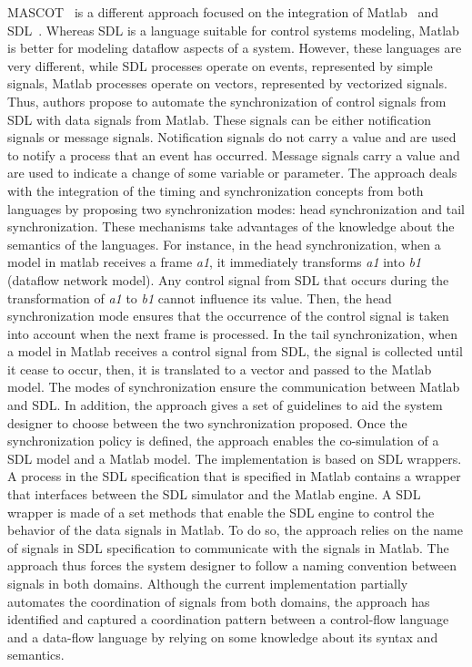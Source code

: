 MASCOT~\cite{mascotbib} is a different approach focused on the integration of Matlab~\cite{matlabbib} and SDL~\cite{sdlbib}. Whereas SDL is a language suitable for control systems modeling, Matlab is better for modeling dataflow aspects of a system. However, these languages are very different, while SDL processes operate on events, represented by simple signals, Matlab processes operate on vectors, represented by vectorized signals. Thus, authors propose to automate the synchronization of control signals from SDL with data signals from Matlab. These signals can be either notification signals or message signals. Notification signals do not carry a value and are used to notify a process that an event has occurred. Message signals carry a value and are used to indicate a change of some variable or parameter. The approach deals with the integration of the timing and synchronization concepts from both languages by proposing two synchronization modes: head synchronization and tail synchronization. These mechanisms take advantages of the knowledge about the semantics of the languages. For instance, in the head synchronization, when a model in matlab receives a frame \emph{a1}, it immediately transforms \emph{a1} into \emph{b1} (dataflow network model). Any control signal from SDL that occurs during the transformation of \emph{a1} to \emph{b1} cannot influence its value. Then, the head synchronization mode ensures that the occurrence of the control signal is taken into account when the next frame is processed. In the tail synchronization, when a model in Matlab receives a control signal from SDL, the signal is collected until it cease to occur, then, it is translated to a vector and passed to the Matlab model. The modes of synchronization ensure the communication between Matlab and SDL. In addition, the approach gives a set of guidelines to aid the system designer to choose between the two synchronization proposed. Once the synchronization policy is defined, the approach enables the co-simulation of a SDL model and a Matlab model. The implementation is based on SDL wrappers. A process in the SDL specification that is specified in Matlab contains a wrapper that interfaces between the SDL simulator and the Matlab engine. A SDL wrapper is made of a set methods that enable the SDL engine to control the behavior of the data signals in Matlab. To do so, the approach relies on the name of signals in SDL specification to communicate with the signals in Matlab. The approach thus forces the system designer to follow a naming convention between signals in both domains. Although the current implementation partially automates the coordination of signals from both domains, the approach has identified and captured a coordination pattern between a control-flow language and a data-flow language by relying on some knowledge about its syntax and semantics.
         	
